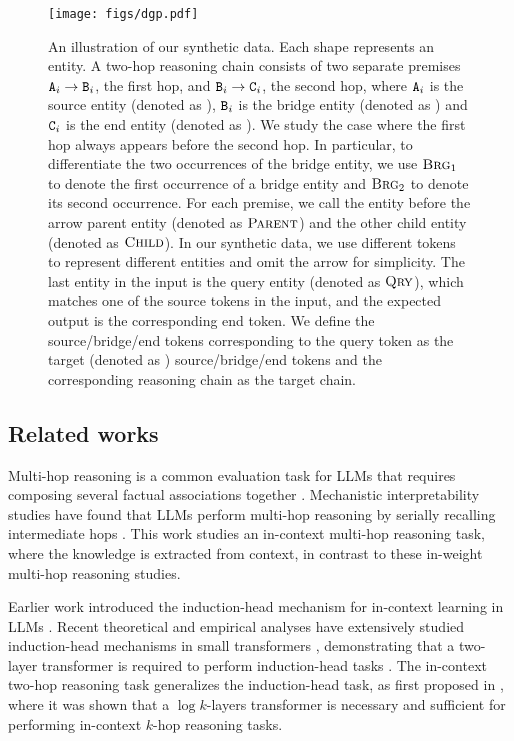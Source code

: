 \begin{figure*}[h]  
    \centering
    \texttt{[image: figs/dgp.pdf]}  
    \caption{An illustration of our synthetic data. Each shape represents an entity. A two-hop reasoning chain consists of two separate premises $\texttt{A}_i\to\texttt{B}_i$, the first hop, and $\texttt{B}_i\to\texttt{C}_i$, the second hop, where $\texttt{A}_i$ is the source entity (denoted as \src), $\texttt{B}_i$ is the bridge entity (denoted as \brg) and $\texttt{C}_i$  is the end entity (denoted as \ed). We study the case where the first hop always appears before the second hop.  In particular, to differentiate the two occurrences of the bridge entity, we use $\textsc{Brg$_1$}$ to denote the first occurrence of a bridge entity and $\textsc{Brg$_2$}$ to denote its second occurrence.  For each premise, we call the entity before the arrow parent entity (denoted as $\textsc{Parent}$) and the other child entity (denoted as $\textsc{Child}$). In our synthetic data, we use different tokens to represent different entities and omit the arrow for simplicity. The last entity in the input is the query entity (denoted as $\textsc{Qry}$), which matches one of the source tokens in the input, and the expected output is the corresponding end token. We define the source/bridge/end tokens corresponding to the query token as the target (denoted as \target) source/bridge/end tokens and the corresponding reasoning chain as the target chain. } 
    \label{fig:data_illustration}
\end{figure*}


\subsection{Related works}
\label{subsec:related_work}


Multi-hop reasoning is a common evaluation task for LLMs that requires composing several factual associations together \citep{zhong2023mquake}. Mechanistic interpretability studies have found that LLMs perform multi-hop reasoning by serially recalling intermediate hops \citep{biran2024hopping, yang2024latent, wang2024grokked, feng2024extractive}. This work studies an in-context multi-hop reasoning task, where the knowledge is extracted from context, in contrast to these in-weight multi-hop reasoning studies.

Earlier work introduced the induction-head mechanism for in-context learning in LLMs \citep{elhage2021mathematical, olsson2022context}. Recent theoretical and empirical analyses have extensively studied induction-head mechanisms in small transformers \citep{bietti2023birth, nichani2024transformers, wang2024transformers, chen2024unveiling}, demonstrating that a two-layer transformer is required to perform induction-head tasks \citep{sanford2024one}. The in-context two-hop reasoning task generalizes the induction-head task, as first proposed in \citet{sanford2024transformers}, where it was shown that a $\log k$-layers transformer is necessary and sufficient for performing in-context $k$-hop reasoning tasks. 


